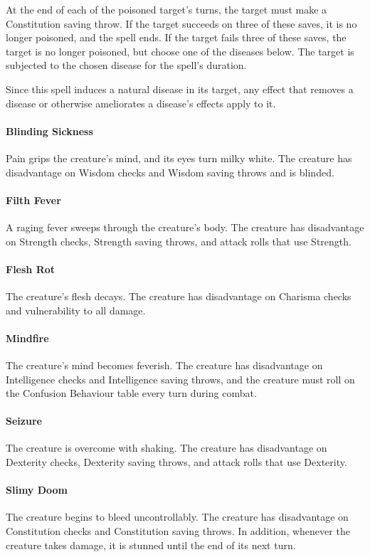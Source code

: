         At the end of each of the poisoned target's turns, the target must make a Constitution saving throw.
        If the target succeeds on three of these saves, it is no longer poisoned, and the spell ends.
        If the target fails three of these saves, the target is no longer poisoned, but choose one of the diseases below.
        The target is subjected to the chosen disease for the spell's duration.

        Since this spell induces a natural disease in its target, any effect that removes a disease or otherwise ameliorates a disease's effects apply to it.

        \paragraph{Blinding Sickness}
        Pain grips the creature's mind, and its eyes turn milky white.
        The creature has disadvantage on Wisdom checks and Wisdom saving throws and is blinded.
        \paragraph{Filth Fever}
        A raging fever sweeps through the creature's body.
        The creature has disadvantage on Strength checks, Strength saving throws, and attack rolls that use Strength.
        \paragraph{Flesh Rot}
        The creature's flesh decays.
        The creature has disadvantage on Charisma checks and vulnerability to all damage.
        \paragraph{Mindfire}
        The creature's mind becomes feverish.
        The creature has disadvantage on Intelligence checks and Intelligence saving throws, and the creature must roll on the Confusion Behaviour table every turn during combat.
        \paragraph{Seizure}
        The creature is overcome with shaking.
        The creature has disadvantage on Dexterity checks, Dexterity saving throws, and attack rolls that use Dexterity.
        \paragraph{Slimy Doom}
        The creature begins to bleed uncontrollably.
        The creature has disadvantage on Constitution checks and Constitution saving throws.
        In addition, whenever the creature takes damage, it is stunned until the end of its next turn.

